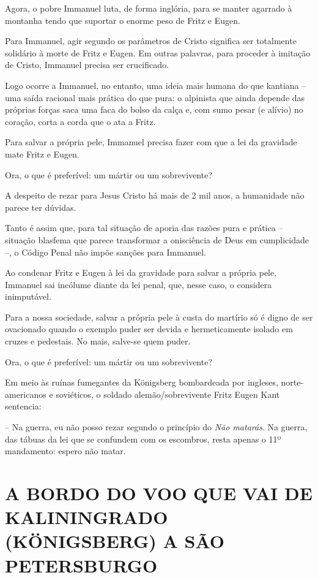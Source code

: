 Agora, o pobre Immanuel luta, de forma inglória, para se manter agarrado
à montanha tendo que suportar o enorme peso de Fritz e Eugen.

Para Immanuel, agir segundo os parâmetros de Cristo significa ser
totalmente solidário à morte de Fritz e Eugen. Em outras palavras, para
proceder à imitação de Cristo, Immanuel precisa ser crucificado.

Logo ocorre a Immanuel, no entanto, uma ideia mais humana do que
kantiana -- uma saída racional mais prática do que pura: o alpinista que
ainda depende das próprias forças saca uma faca do bolso da calça e, com
sumo pesar (e alívio) no coração, corta a corda que o ata a Fritz.

Para salvar a própria pele, Immanuel precisa fazer com que a lei da
gravidade mate Fritz e Eugen.

Ora, o que é preferível: um mártir ou um sobrevivente?

A despeito de rezar para Jesus Cristo há mais de 2 mil anos, a
humanidade não parece ter dúvidas.

Tanto é assim que, para tal situação de aporia das razões pura e prática
-- situação blasfema que parece transformar a onisciência de Deus em
cumplicidade --, o Código Penal não impõe sanções para Immanuel.

Ao condenar Fritz e Eugen à lei da gravidade para salvar a própria pele,
Immanuel sai incólume diante da lei penal, que, nesse caso, o considera
inimputável.

Para a nossa sociedade, salvar a própria pele à custa do martírio só é
digno de ser ovacionado quando o exemplo puder ser devida e
hermeticamente isolado em cruzes e pedestais. No mais, salve-se quem
puder.

Ora, o que é preferível: um mártir ou um sobrevivente?

Em meio às ruínas fumegantes da Königsberg bombardeada por ingleses,
norte-americanos e soviéticos, o soldado alemão/sobrevivente Fritz Eugen
Kant sentencia:

-- Na guerra, eu não posso rezar segundo o princípio do \emph{Não
matarás}. Na guerra, das tábuas da lei que se confundem com os
escombros, resta apenas o 11º mandamento: espero não matar.

\part{A BORDO DO VOO QUE VAI DE KALININGRADO (KÖNIGSBERG) A SÃO PETERSBURGO}

